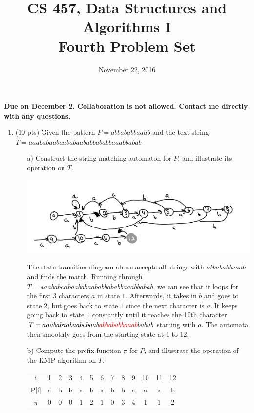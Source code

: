 \documentclass{article}
\begin{document}
\title{CS 457, Data Structures and Algorithms I\\
Fourth Problem Set}
\date{November 22, 2016}
\maketitle
\begin{center}
\textbf{Due on December 2. Collaboration is not allowed. Contact me directly with any questions.}
\end{center}
\begin{enumerate}

\item (10 pts) Given the pattern $P=abbababbaaab$ and the text string $T=aaababaabaababaababbababbaaabbabab$
\begin{itemize}
\item[a)] Construct the string matching automaton for $P$, and illustrate its operation on $T$.

\includegraphics[scale=0.4]{automata}

The state-transition diagram above accepts all strings with $abbababbaaab$ and finds the match. Running through $T=aaababaabaababaababbababbaaabbabab$, we can see that it loops for the first 3 characters $a$ in state $1$. Afterwards, it takes in $b$ and goes to state $2$, but goes back to state $1$ since the next character is $a$. It keeps going back to state $1$ constantly until it reaches the 19th character 
$T=aaababaabaababaab\textcolor{red}{abbababbaaab}babab$ starting with $a$. The automata then smoothly goes from the starting state at 1 to 12. 
\newpage

\item[b)] Compute the prefix function $\pi$ for $P$, and illustrate the operation of the KMP algorithm on $T$.

\begin{center}
\begin{tabular}{ c c c c c c c c c c c c c}
 i & 1 & 2 & 3 & 4 & 5 & 6 & 7 & 8 & 9 & 10 & 11 & 12 \\ 
 P[i] & a & b & b & a & b & a & b & b & a & a & a & b \\
 $\pi$ & 0&0&0&1&2&1&0&3&4&1&1&2
\end{tabular}
\end{center}


\end{itemize}
\end{enumerate}
\end{document}
